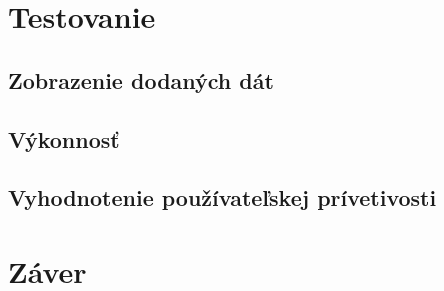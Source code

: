\chapter{Testovanie}

\section{Zobrazenie dodaných dát}


\section{Výkonnosť}

\section{Vyhodnotenie používateľskej prívetivosti}

\chapter{Záver}



%
